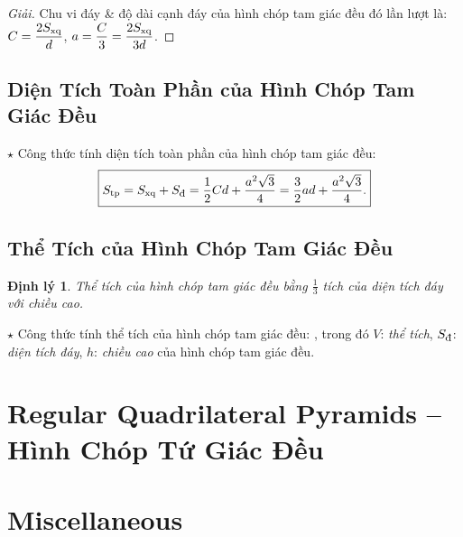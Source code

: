 \documentclass{article}
\newtheorem{dinhly}{Định lý}
\begin{document}
\begin{proof}[Giải]
	Chu vi đáy \& độ dài cạnh đáy của hình chóp tam giác đều đó lần lượt là: $C = \dfrac{2S_{\rm xq}}{d}$, $a = \dfrac{C}{3} = \dfrac{2S_{\rm xq}}{3d}$.
\end{proof}

\subsection{Diện Tích Toàn Phần của Hình Chóp Tam Giác Đều}
\noindent$\star$ {\sf Công thức tính diện tích toàn phần của hình chóp tam giác đều:}
\begin{align*}
	\boxed{S_{\rm tp} = S_{\rm xq} + S_{\footnotesize\mbox{\rm đ}} = \frac{1}{2}Cd + \frac{a^2\sqrt{3}}{4} = \frac{3}{2}ad + \frac{a^2\sqrt{3}}{4}.}
\end{align*}

\subsection{Thể Tích của Hình Chóp Tam Giác Đều}

\begin{dinhly}
	Thể tích của hình chóp tam giác đều bằng $\frac{1}{3}$ tích của diện tích đáy với chiều cao.
\end{dinhly}
\noindent$\star$ {\sf Công thức tính thể tích của hình chóp tam giác đều:} , trong đó $V$: \textit{thể tích}, $S_{\footnotesize\mbox{\rm đ}}$: \textit{diện tích đáy}, $h$: \textit{chiều cao} của hình chóp tam giác đều.


\section{Regular Quadrilateral Pyramids -- Hình Chóp Tứ Giác Đều}


\section{Miscellaneous}


\printbibliography[heading=bibintoc]
	
\end{document}
